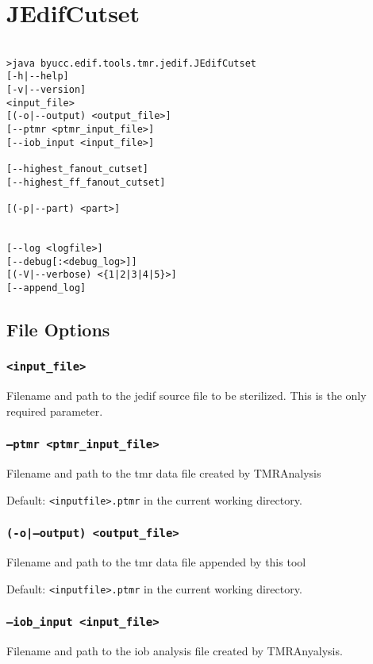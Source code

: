 \section{JEdifCutset}
\begin{verbatim}

>java byucc.edif.tools.tmr.jedif.JEdifCutset 
[-h|--help] 
[-v|--version] 
<input_file> 
[(-o|--output) <output_file>] 
[--ptmr <ptmr_input_file>] 
[--iob_input <input_file>] 

[--highest_fanout_cutset] 
[--highest_ff_fanout_cutset] 

[(-p|--part) <part>] 


[--log <logfile>] 
[--debug[:<debug_log>]] 
[(-V|--verbose) <{1|2|3|4|5}>] 
[--append_log]

\end{verbatim}
\subsection{File Options}

\subsubsection{\texttt{<input\_file>}}
Filename and path to the jedif source file to be
sterilized. This is the only required parameter.

\subsubsection{\texttt{--ptmr <ptmr\_input\_file>}}
Filename and path to the tmr data file created by TMRAnalysis

Default: \texttt{<inputfile>.ptmr} in the current working directory.

\subsubsection{\texttt{(-o|--output) <output\_file>}}
Filename and path to the tmr data file appended by this tool

Default: \texttt{<inputfile>.ptmr} in the current working directory.

\subsubsection{\texttt{--iob\_input <input\_file>}}
Filename and path to the iob analysis file created by TMRAnyalysis.

